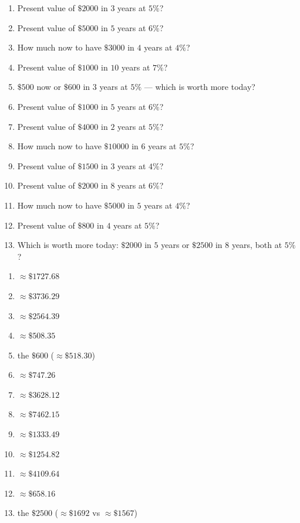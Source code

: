 \documentclass[11pt]{article}
\begin{document}
\begin{recapbox}
\begin{multicols}{2}
\small
\begin{enumerate}[leftmargin=*,itemsep=3pt]
  \item Present value of $\$2000$ in $3$ years at $5\%$?
  \item Present value of $\$5000$ in $5$ years at $6\%$?
  \item How much now to have $\$3000$ in $4$ years at $4\%$?
  \item Present value of $\$1000$ in $10$ years at $7\%$?
  \item $\$500$ now or $\$600$ in $3$ years at $5\%$ — which is worth more today?
  \item Present value of $\$1000$ in $5$ years at $6\%$?
  \item Present value of $\$4000$ in $2$ years at $5\%$?
  \item How much now to have $\$10000$ in $6$ years at $5\%$?
  \item Present value of $\$1500$ in $3$ years at $4\%$?
  \item Present value of $\$2000$ in $8$ years at $6\%$?
  \item How much now to have $\$5000$ in $5$ years at $4\%$?
  \item Present value of $\$800$ in $4$ years at $5\%$?
  \item Which is worth more today: $\$2000$ in $5$ years or $\$2500$ in $8$ years, both at $5\%$?
\end{enumerate}
\end{multicols}
\end{recapbox}

\begin{keybox}
\begin{multicols}{2}
\small
\begin{enumerate}[leftmargin=*,itemsep=3pt]
  \item $\approx\$1727.68$
  \item $\approx\$3736.29$
  \item $\approx\$2564.39$
  \item $\approx\$508.35$
  \item the $\$600$ ($\approx\$518.30$)
  \item $\approx\$747.26$
  \item $\approx\$3628.12$
  \item $\approx\$7462.15$
  \item $\approx\$1333.49$
  \item $\approx\$1254.82$
  \item $\approx\$4109.64$
  \item $\approx\$658.16$
  \item the $\$2500$ ($\approx\$1692$ vs $\approx\$1567$)
\end{enumerate}
\end{multicols}
\end{keybox}
\end{document}

